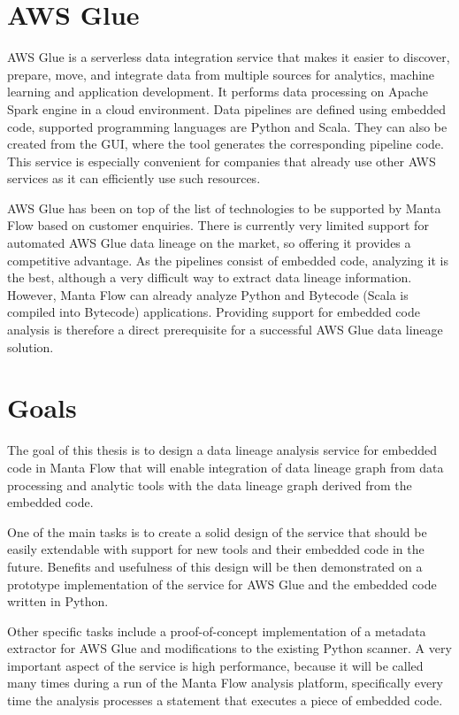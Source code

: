 \section{AWS Glue}

AWS Glue is a serverless data integration service that makes it easier to discover, prepare, move, and integrate data from multiple sources for analytics, machine learning and application development. It performs data processing on Apache Spark engine in a cloud environment. Data pipelines are defined using embedded code, supported programming languages are Python and Scala. They can also be created from the GUI, where the tool generates the corresponding pipeline code. This service is especially convenient for companies that already use other AWS services as it can efficiently use such resources.
\par
AWS Glue has been on top of the list of technologies to be supported by Manta Flow based on customer enquiries. There is currently very limited support for automated AWS Glue data lineage on the market, so offering it provides a competitive advantage. As the pipelines consist of embedded code, analyzing it is the best, although a very difficult way to extract data lineage information. However, Manta Flow can already analyze Python and Bytecode (Scala is compiled into Bytecode) applications. Providing support for embedded code analysis is therefore a direct prerequisite for a successful AWS Glue data lineage solution.

\section{Goals}

The goal of this thesis is to design a data lineage analysis service for embedded code in Manta Flow that will enable integration of data lineage graph from data processing and analytic tools with the data lineage graph derived from the embedded code.
\par
One of the main tasks is to create a solid design of the service that should be easily extendable with support for new tools and their embedded code in the future. Benefits and usefulness of this design will be then demonstrated on a prototype implementation of the service for AWS Glue and the embedded code written in Python.
\par
Other specific tasks include a proof-of-concept implementation of a metadata extractor for AWS Glue and modifications to the existing Python scanner. A very important aspect of the service is high performance, because it will be called many times during a run of the Manta Flow analysis platform, specifically every time the analysis processes a statement that executes a piece of embedded code.

